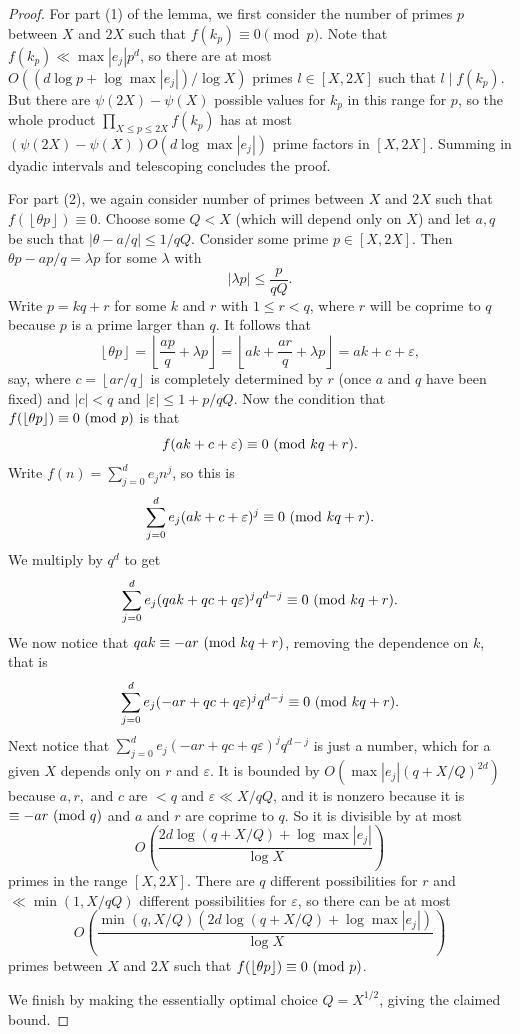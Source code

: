 \documentclass[12pt, a4paper]{amsart}
\theoremstyle{remark}
\newcommand{\abs}[1]{\left|#1\right|}
\newcommand{\floor}[1]{\left\lfloor#1\right\rfloor}
\renewcommand{\mod}[1]{{\ifmmode\text{\rm\ (mod~$#1$)}\else\discretionary{}{}{\hbox{ }}\rm(mod~$#1$)\fi}}
\begin{document}
\begin{proof}
    For part (1) of the lemma, we first consider the number of primes $p$ between $X$ and $2X$ such that $f(k_p)\equiv 0\pmod p$. Note that $f(k_p) \ll \max{\abs{e_j}}p^d$, so there are at most
    $O((d\log p + \log \max \abs{e_j})/\log X)$ primes $l\in [X, 2X]$ such
    that $l \mid f(k_p)$. But there are $\psi(2X)-\psi(X)$ possible
    values for $k_p$ in this range for $p$, so the whole product
    $\prod_{X\leq p\leq 2X} f(k_p) $ has at most
    $(\psi(2X)-\psi(X))O(d \log \max \abs{e_j})$ prime factors in $[X, 2X]$. Summing in dyadic intervals and telescoping concludes the proof.

    For part (2), we again consider
     number of primes between
    $X$ and $2X$ such that $f(\floor{\theta p}) \equiv 0$. Choose some $Q < X$
    (which will depend only on $X$) and let $a, q$ be such that
    $\abs{\theta - a/q} \le 1/qQ.$
    Consider some prime $p \in [X, 2X]$.
    Then $\theta p - ap/q = \lambda p$ for some $\lambda$ with 
    \[
        |\lambda p| \le \frac{p}{qQ}.
    \]
    Write $p = kq + r$ for some $k$ and $r$ with $1 \le r < q$,
    where $r$ will be coprime to $q$ because $p$ is a prime larger
    than $q$. It follows that
    \[
        \floor{\theta p} = \floor{\frac{ap}{q} + \lambda p} = \floor{ak + \frac{ar}{q} + \lambda p}
             = ak + c + \varepsilon,
    \]
    say, where $c = \floor{ar/q}$ is completely determined by $r$
    (once $a$ and $q$ have been fixed) and
    $\abs{c} < q$ and $\abs{\varepsilon} \le 1 + p/qQ$.
    Now the condition that $f(\floor{\theta p}) \equiv 0 \mod p$ is that
    \[
        f(ak + c + \varepsilon) \equiv 0 \mod {kq + r}.
    \]
    Write $f(n) = \sum_{j=0}^d e_j n^j$, so this is
    \[
        \sum_{j=0}^d e_j (ak + c + \varepsilon)^j \equiv 0 \mod {kq + r}.
    \]
    We multiply by $q^d$ to get
    \[
        \sum_{j=0}^d e_j (qak + qc + q\varepsilon)^j q^{d-j} \equiv 0 \mod {kq + r}.
    \]
    We now notice that $qak \equiv -ar \mod{kq + r}$, removing the dependence
    on $k$, that is
    \[
        \sum_{j=0}^d e_j (-ar + qc + q\varepsilon)^j q^{d-j} \equiv 0 \mod {kq + r}.
    \]
    Next notice that $\sum_{j=0}^d e_j (-ar + qc + q\varepsilon)^j q^{d-j}$
    is just a number, which for a given $X$ depends only on $r$ and $\varepsilon$. It
    is bounded by $O(\max\abs{e_j}(q + X/Q)^{2d})$ because $a, r, $ and $c$ are $< q$
    and $\varepsilon \ll X/qQ$, and
    it is nonzero because it is $\equiv -ar \mod q$ and $a$ and $r$ are
    coprime to $q$. So it is divisible by at most
    \[
        O\left(\frac{2d \log (q + X/Q) + \log\max\abs{e_j}}{\log X}\right)
    \]
    primes
    in the range $[X, 2X]$. There are $q$ different possibilities for $r$
    and $ \ll \min(1, X/qQ)$ different possibilities for $\varepsilon$, so there 
    can be at most
    \[
        O\left(\frac{\min(q, X/Q)(2d\log (q + X/Q) + \log\max\abs{e_j})}{\log X} \right)
    \]
    primes between $X$ and $2X$ such that $f(\floor{\theta p}) \equiv 0 \mod p$. 
    
    We finish by making the essentially optimal choice $Q = X^{1/2}$, giving the claimed bound. 
\end{proof}
\end{document}
